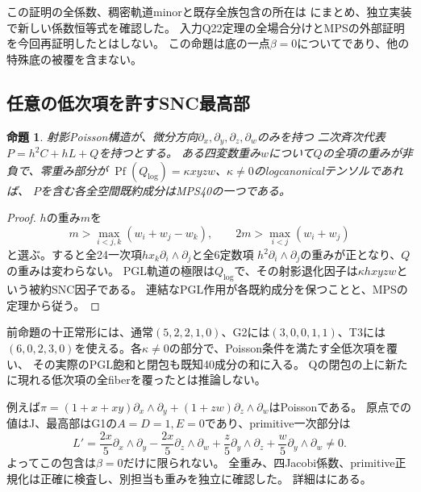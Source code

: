 \documentclass[a4paper,11pt]{ltjsarticle}
\newtheorem{proposition}{命題}[section]
\theoremstyle{definition}
\begin{document}
この証明の全係数、稠密軌道minorと既存全族包含の所在は
にまとめ、独立実装で新しい係数恒等式を確認した。
入力Q22定理の全場合分けとMPSの外部証明を今回再証明したとはしない。
この命題は底の一点\(\beta=0\)についてであり、他の特殊底の被覆を含まない。

\subsection{任意の低次項を許すSNC最高部}
\begin{proposition}\label{prop:lower-snc}
射影Poisson構造が、微分方向\(\partial_x,\partial_y,\partial_z,\partial_w\)のみを持つ
二次斉次代表\(P=h^2C+hL+Q\)を持つとする。
ある四変数重み\(w\)について\(Q\)の全項の重みが非負で、零重み部分が
\(\operatorname{Pf}(Q_{\log})=\kappa xyzw\)、\(\kappa\ne0\)のlogcanonicalテンソルであれば、
\(P\)を含む各全空間既約成分はMPS40の一つである。
\end{proposition}
\begin{proof}
\(h\)の重み\(m\)を
\[
 m>\max_{i<j,k}(w_i+w_j-w_k),\qquad 2m>\max_{i<j}(w_i+w_j)
\]
と選ぶ。すると全24一次項\(hx_k\partial_i\wedge\partial_j\)と全6定数項
\(h^2\partial_i\wedge\partial_j\)の重みが正となり、\(Q\)の重みは変わらない。
PGL軌道の極限は\(Q_{\log}\)で、その射影退化因子は\(\kappa hxyzw\)という被約SNC因子である。
連結なPGL作用が各既約成分を保つことと、MPSの定理\cite{mps}から従う。
\end{proof}

前命題の十正常形には、通常\((5,2,2,1,0)\)、G2には\((3,0,0,1,1)\)、T3には
\((6,0,2,3,0)\)を使える。各\(\kappa\ne0\)の部分で、Poisson条件を満たす全低次項を覆い、
その実際のPGL飽和と閉包も既知40成分の和に入る。
Qの閉包の上に新たに現れる低次項の全fiberを覆ったとは推論しない。

例えば\(\pi=(1+x+xy)\partial_x\wedge\partial_y+(1+zw)\partial_z\wedge\partial_w\)はPoissonである。
原点での値はJ、最高部はG1の\(A=D=1,E=0\)であり、primitive一次部分は
\[
 L'=\frac{2x}{5}\partial_x\wedge\partial_y-\frac{2x}{5}\partial_z\wedge\partial_w
       +\frac z5\partial_y\wedge\partial_z+\frac w5\partial_y\wedge\partial_w\ne0.
\]
よってこの包含は\(\beta=0\)だけに限られない。
全重み、四Jacobi係数、primitive正規化は正確に検査し、別担当も重みを独立に確認した。
詳細はにある。
\end{document}

